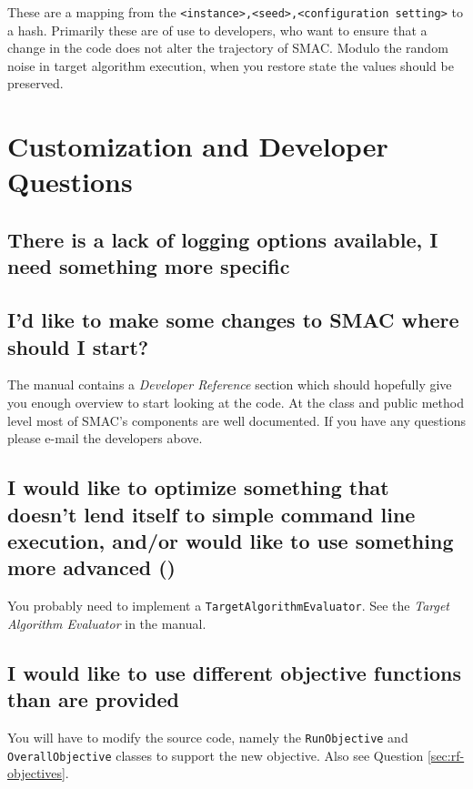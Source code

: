\documentclass[11pt,letterpaper,oneside]{article}
\begin{document}
These are a mapping from the \texttt{<instance>,<seed>,<configuration setting>} to a hash. Primarily these are of use to developers, who want to ensure that a change in the code does not alter the trajectory of SMAC. Modulo the random noise in target algorithm execution, when you restore state the values should be preserved.




	
\section{Customization and Developer Questions}

\subsection{There is a lack of logging options available, I need something more specific}
\label{sec:alternative-logging}
	

	
	
\subsection{I'd like to make some changes to SMAC where should I start?}

	The manual contains a \emph{Developer Reference} section which should hopefully give you enough overview to start looking at the code. At the class and public method level most of SMAC's components are well documented. If you have any questions please e-mail the developers above.

\subsection{I would like to optimize something that doesn't lend itself to simple command line execution, and/or would like to use something more advanced ()}

	You probably need to implement a \texttt{TargetAlgorithmEvaluator}. See the \emph{Target Algorithm Evaluator} in the manual.

\subsection{I would like to use different objective functions than are provided}

	You will have to modify the source code, namely the \texttt{RunObjective} and \texttt{OverallObjective} classes to support the new objective. Also see Question \ref{sec:rf-objectives}.
\end{document}
